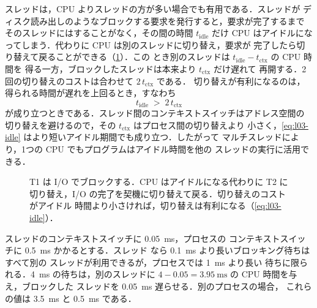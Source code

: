 \documentclass[../main.tex]{subfiles}
\begin{document}
スレッドは，CPU よりスレッドの方が多い場合でも有用である．スレッドが
ディスク読み出しのようなブロックする要求を発行すると，要求が完了するまで
そのスレッドにはすることがなく，その間の時間 $t_{\mathrm{idle}}$ だけ CPU
はアイドルになってしまう．代わりに CPU は別のスレッドに切り替え，要求が
完了したら切り替えて戻ることができる（\cref{fig:l03-idle-time}）．この
とき別のスレッドは $t_{\mathrm{idle}} - t_{\mathrm{ctx}}$ の CPU 時間を
得る一方，ブロックしたスレッドは本来より $t_{\mathrm{ctx}}$ だけ遅れて
再開する．2回の切り替えのコストは合わせて $2\,t_{\mathrm{ctx}}$ である．
切り替えが有利になるのは，得られる時間が遅れを上回るとき，すなわち
\begin{equation}
  t_{\mathrm{idle}} \;>\; 2\, t_{\mathrm{ctx}}
  \label{eq:l03-idle}
\end{equation}
が成り立つときである．スレッド間のコンテキストスイッチはアドレス空間の
切り替えを避けるので，その $t_{\mathrm{ctx}}$ はプロセス間の切り替えより
小さく，\cref{eq:l03-idle} はより短いアイドル期間でも成り立つ．したがって
マルチスレッドにより，1つの CPU でもプログラムはアイドル時間を他の
スレッドの実行に活用できる．

\begin{figure}[htbp]
  \centering
  
  \caption{T1 は I/O でブロックする．CPU はアイドルになる代わりに T2 に
    切り替え，I/O の完了を契機に切り替えて戻る．切り替えのコストがアイドル
    時間より小さければ，切り替えは有利になる（\cref{eq:l03-idle}）．}
  \label{fig:l03-idle-time}
\end{figure}

\begin{example}
  スレッドのコンテキストスイッチに \SI{0.05}{\milli\second}，プロセスの
  コンテキストスイッチに \SI{0.5}{\milli\second} かかるとする．スレッド
  なら \SI{0.1}{\milli\second} より長いブロッキング待ちはすべて別の
  スレッドが利用できるが，プロセスでは \SI{1}{\milli\second} より長い
  待ちに限られる．\SI{4}{\milli\second} の待ちは，別のスレッドに
  $4 - 0.05 = \SI{3.95}{\milli\second}$ の CPU 時間を与え，ブロックした
  スレッドを \SI{0.05}{\milli\second} 遅らせる．別のプロセスの場合，
  これらの値は \SI{3.5}{\milli\second} と
  \SI{0.5}{\milli\second} である．
\end{example}
\end{document}

